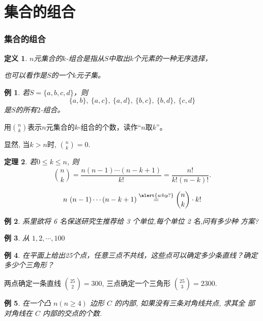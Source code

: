 \documentclass[13pt, punct]{ctexbeamer}
\newtheorem{thm}{定理}[section]
\newtheorem{defi}[thm]{定义}
\newtheorem{ex}{例}[section]
\begin{document}
\section{集合的组合}
\begin{frame}\frametitle{集合的组合}
\begin{defi}
	$n$元集合的\alert{$k$-组合}是指从$S$中取出$k$个元素的一种无序选择，

	也可以看作是$S$的一个$k$元子集。
\end{defi}

\begin{ex}
若$S=\{a,b,c,d\}$，则 $$\{a,b\},\	\{a,c\},\ \{a,d\}, \ \{b,c\},\ \{b,d\},\ \{c,d\}$$
是$S$的所有$2$-组合。
\end{ex}
\end{frame}


\begin{frame}
用${n \choose k}$表示$n$元集合的$k$-组合的个数，读作“$n$取$k$”。




\pause
显然, 当$k>n$时,  ${n \choose k}=0.$
\begin{thm}
    若$0 \le k \le n$, 则
	$${n \choose k} = \frac{n (n-1) \cdots (n-k+1)}{k!}=\frac{n!}{k!(n-k)!}.$$
\end{thm}
$$n \ (n-1) \cdots (n-k+1) \overset{\alert{why?}}{=} {n \choose k} \cdot k!$$
\end{frame}

\begin{frame}
\begin{ex}
    系里欲将 6 名保送研究生推荐给 3 个单位,每个单位 2 名,问有多少种 方案?
\end{ex}


\begin{ex}
 { 从 } $1,2, \cdots, 100$ 
\end{ex}



\end{frame}


\begin{frame}
\begin{ex}
在平面上给出25个点，任意三点不共线，这些点可以确定多少条直线？确定多少个三角形？
\end{ex}
\pause
两点确定一条直线 ${25 \choose 2} =300$,
\qquad
三点确定一个三角形 ${25 \choose 3} =2300$.


\begin{ex}在一个凸 $n(n \geqslant 4)$ 边形 $C$ 的内部, 如果没有三条对角线共点, 求其全 部对角线在 $C$ 内部的交点的个数.

\end{ex}
\end{frame}
\end{document}
